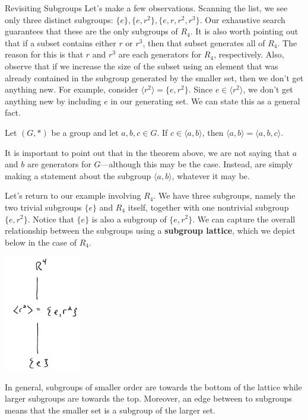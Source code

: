 \begin{section}{Revisiting Subgroups}
Let's make a few observations.  Scanning the list, we see only three distinct subgroups: $\{e\}, \{e,r^2\},\{e,r,r^2,r^3\}$.  Our exhaustive search guarantees that these are the only subgroups of $R_4$.  It is also worth pointing out that if a subset contains either $r$ or $r^3$, then that subset generates all of $R_4$.  The reason for this is that $r$ and $r^3$ are each generators for $R_4$, respectively.  Also, observe that if we increase the size of the subset using an element that was already contained in the subgroup generated by the smaller set, then we don't get anything new.  For example, consider $\langle r^2\rangle=\{e,r^2\}$.  Since $e\in\langle r^2\rangle$, we don't get anything new by including $e$ in our generating set.  We can state this as a general fact.

\begin{theorem}
Let $(G,*)$ be a group and let $a,b,c\in G$.  If $c\in\langle a,b\rangle$, then $\langle a,b\rangle = \langle a,b,c\rangle$.
\end{theorem}

It is important to point out that in the theorem above, we are not saying that $a$ and $b$ are generators for $G$---although this may be the case.  Instead, are simply making a statement about the subgroup $\langle a,b\rangle$, whatever it may be.

Let's return to our example involving $R_4$.  We have three subgroups, namely the two trivial subgroups $\{e\}$ and $R_4$ itself, together with one nontrivial subgroup $\{e,r^2\}$.  Notice that $\{e\}$ is also a subgroup of $\{e,r^2\}$.  We can capture the overall relationship between the subgroups using a \textbf{subgroup lattice}, which we depict below in the case of $R_4$.

\begin{center}
\includegraphics[height=2in]{latticeR4.png}
\end{center}

In general, subgroups of smaller order are towards the bottom of the lattice while larger subgroups are towards the top.  Moreover, an edge between to subgroups means that the smaller set is a subgroup of the larger set.


\end{section}
